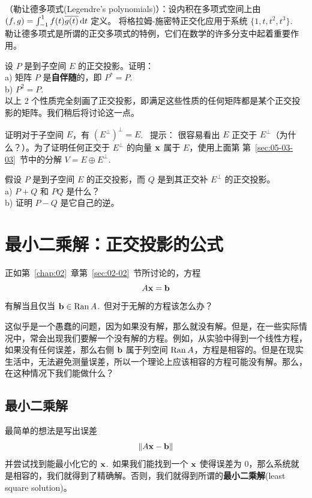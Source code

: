 \begin{problemset}
\item \label{ex:05-03-10} （勒让德多项式(Legendre’s polynomials)）：设内积在多项式空间上由 $(f, g) = \int_{-1}^1 f(t)\overline{g(t)}\mathop{}\!\mathrm{d} t$ 定义。
将格拉姆-施密特正交化应用于系统 $\{1, t, t^2, t^3\}$.~
\\
勒让德多项式是所谓的正交多项式的特例，它们在数学的许多分支中起着重要作用。
\item \label{ex:05-03-11} 设 $P$ 是到子空间 $E$ 的正交投影。证明：
\\
a) 矩阵 $P$ 是\textbf{自伴随}的，即 $P^* = P$.~
\\
b) $P^2 = P$.~
\\
以上 2 个性质完全刻画了正交投影，即满足这些性质的任何矩阵都是某个正交投影的矩阵。我们稍后将讨论这一点。
\item \label{ex:05-03-12} 证明对于子空间 $E$，有 $(E^\perp)^\perp = E$.~
{\heiti 提示：} 很容易看出 $E$ 正交于 $E^\perp$（为什么？）。为了证明任何正交于 $E^\perp$ 的向量 $\mathbf{x}$ 属于 $E$，使用上面第 第~\ref{sec:05-03-03}~节中的分解 $V = E \oplus E^\perp$.~
\item \label{ex:05-03-13} 假设 $P$ 是到子空间 $E$ 的正交投影，而 $Q$ 是到其正交补 $E^\perp$ 的正交投影。
\\
a) $P+Q$ 和 $PQ$ 是什么？
\\
b) 证明 $P-Q$ 是它自己的逆。
\end{problemset}

\section{最小二乘解：正交投影的公式}\label{sec:05-04}
正如第~\ref{chap:02}~章第~\ref{sec:02-02}~节所讨论的，方程 $$A\mathbf{x} = \mathbf{b}$$
有解当且仅当 $\mathbf{b} \in \operatorname{Ran} A$.~但对于无解的方程该怎么办？

这似乎是一个愚蠢的问题，因为如果没有解，那么就没有解。但是，在一些实际情况中，常会出现我们要解一个没有解的方程。例如，从实验中得到一个线性方程，如果没有任何误差，那么右侧 $\mathbf{b}$ 属于列空间 $\operatorname{Ran} A$，方程是相容的。但是在现实生活中，无法避免测量误差，所以一个理论上应该相容的方程可能没有解。那么，在这种情况下我们能做什么？

\subsection{最小二乘解}\label{sec:05-04-01}

最简单的想法是写出误差
$$\|A\mathbf{x} - \mathbf{b}\|$$
 并尝试找到能最小化它的 $\mathbf{x}$.~如果我们能找到一个 $\mathbf{x}$ 使得误差为 $0$，那么系统就是相容的，我们就得到了精确解。否则，我们就得到所谓的\textbf{最小二乘解}(least square solution)。

